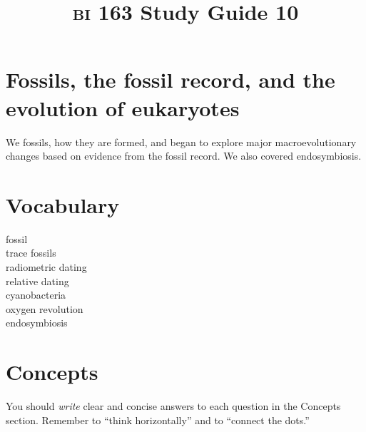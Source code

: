\documentclass[letterpaper]{tufte-handout}
\title{{\scshape bi} 163 Study Guide 10}
\date{} %
\begin{document}
\maketitle	%

\section*{Fossils, the fossil record, and the evolution of eukaryotes }

We fossils, how they are formed, and began to explore major macroevolutionary changes based on evidence from the fossil record. We also covered endosymbiosis.

\section*{Vocabulary}

\vspace{-1\baselineskip}
\begin{multicols}{2}
fossil\\
trace fossils \\
radiometric dating \\
relative dating \\
cyanobacteria \\
oxygen revolution \\
endosymbiosis
\end{multicols}

\section*{Concepts}

You should \emph{write} clear and concise answers to each question in the Concepts section.  Remember to ``think horizontally'' and to ``connect the dots.'' 
\end{document}
